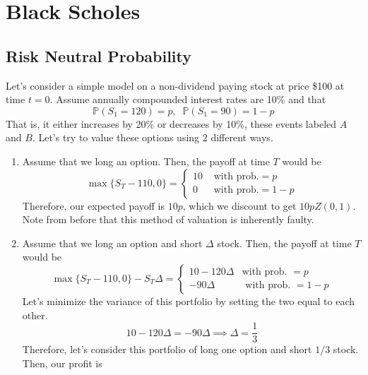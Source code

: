 \documentclass{article}
\begin{document}
\section{Black Scholes}

  \subsection{Risk Neutral Probability}

    Let's consider a simple model on a non-dividend paying stock at price \$100 at time $t = 0$. Assume annually compounded interest rates are 10\% and that 
    \begin{equation}
      \mathbb{P}(S_1 = 120) = p, \;\; \mathbb{P}(S_1 = 90) = 1 - p
    \end{equation}
    That is, it either increases by 20\% or decreases by 10\%, these events labeled $A$ and $B$. Let's try to value these options using 2 different ways. 
    \begin{enumerate}
      \item Assume that we long an option. Then, the payoff at time $T$ would be 
        \begin{equation}
          \max\{S_T - 110, 0\} = \begin{cases}
            10 & \text{ with prob.} = p \\ 
            0 & \text{ with prob.} = 1 - p 
          \end{cases} 
        \end{equation}
        Therefore, our expected payoff is $10p$, which we discount to get $10p Z(0, 1)$. Note from before that this method of valuation is inherently faulty. 

      \item Assume that we long an option and short $\Delta$ stock. Then, the payoff at time $T$ would be 
        \begin{equation}
          \max\{S_T - 110, 0\} - S_T \Delta = \begin{cases} 
            10 - 120 \Delta & \text{with prob. } = p  \\ 
            - 90\Delta & \text{ with prob. } = 1 - p
          \end{cases} 
        \end{equation}
        Let's minimize the variance of this portfolio by setting the two equal to each other. 
        \begin{equation}
          10 - 120 \Delta = -90 \Delta \implies \Delta = \frac{1}{3}
        \end{equation}
        Therefore, let's consider this portfolio of long one option and short $1/3$ stock. Then, our profit is 
    \end{enumerate}
\end{document}
